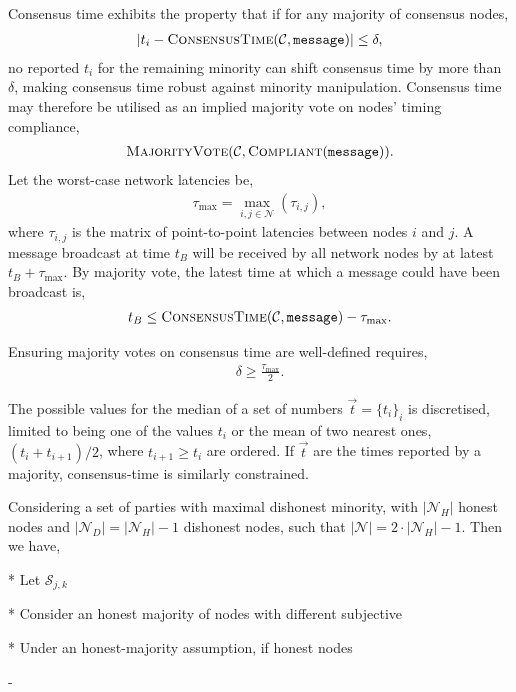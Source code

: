 Consensus time exhibits the property that if for any majority of consensus nodes,
\begin{align}
	|t_i - \textsc{ConsensusTime}(\mathcal{C},\texttt{message})|	\leq \delta,
\end{align}
no reported $t_i$ for the remaining minority can shift consensus time by more than $\delta$, making consensus time robust against minority manipulation. Consensus time may therefore be utilised as an implied majority vote on nodes' timing compliance,
\begin{align}
	\textsc{MajorityVote}(\mathcal{C}, \textsc{Compliant}(\texttt{message})).
\end{align}
Let the worst-case network latencies be,
\begin{align}
	\tau_\mathrm{max} = \max_{i,j\in\mathcal{N}}(\tau_{i,j}),
\end{align}
where $\tau_{i,j}$ is the matrix of point-to-point latencies between nodes $i$ and $j$. A message broadcast at time $t_B$ will be received by all network nodes by at latest $t_B+\tau_\mathrm{max}$.
By majority vote, the latest time at which a message could have been broadcast is,
\begin{align}
	t_B \leq \textsc{ConsensusTime}(\mathcal{C},\texttt{message}) - \tau_\mathrm{max}.
\end{align}

Ensuring majority votes on consensus time are well-defined requires,
\begin{align}
	\delta \geq \frac{\tau_\mathrm{max}}{2}.
\end{align}

The possible values for the median of a set of numbers $\vec{t}=\{t_i\}_i$ is discretised, limited to being one of the values $t_i$ or the mean of two nearest ones, $(t_i+t_{i+1})/2$, where $t_{i+1}\geq t_i$ are ordered. If $\vec{t}$ are the times reported by a majority, consensus-time is similarly constrained.

Considering a set of parties with maximal dishonest minority, with $|\mathcal{N}_H|$ honest nodes and $|\mathcal{N}_D|=|\mathcal{N}_H|-1$ dishonest nodes, such that $|\mathcal{N}|=2\cdot|\mathcal{N}_H|-1$. Then we have,


* Let $\mathcal{S}_{j,k}$

* Consider an honest majority of nodes with different subjective


* Under an honest-majority assumption, if honest nodes

-

